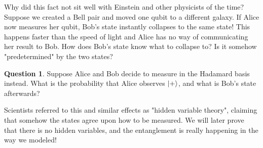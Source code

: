 \documentclass[letterpaper, 12pt]{article}
\newcommand{\1}{\mathds{1}}	%
\theoremstyle{definition}
\newtheorem{question}{Question}
\begin{document}
Why did this fact not sit well with Einstein and other physicists of the time? Suppose we created a Bell pair and moved one qubit to a different galaxy. If Alice now measures her qubit, Bob's state instantly collapses to the same state! This happens faster than the speed of light and Alice has no way of communicating her result to Bob. How does Bob's state know what to collapse to? Is it somehow "predetermined" by the two states? 

\begin{question}
    Suppose Alice and Bob decide to measure in the Hadamard basis instead. What is the probability that Alice observes $\ket{+}$, and what is Bob's state afterwards? 
\end{question}
\vspace{100mm}

Scientists referred to this and similar effects as "hidden variable theory", claiming that somehow the states agree upon how to be measured. We will later prove that there is no hidden variables, and the entanglement is really happening in the way we modeled! 
\end{document}
